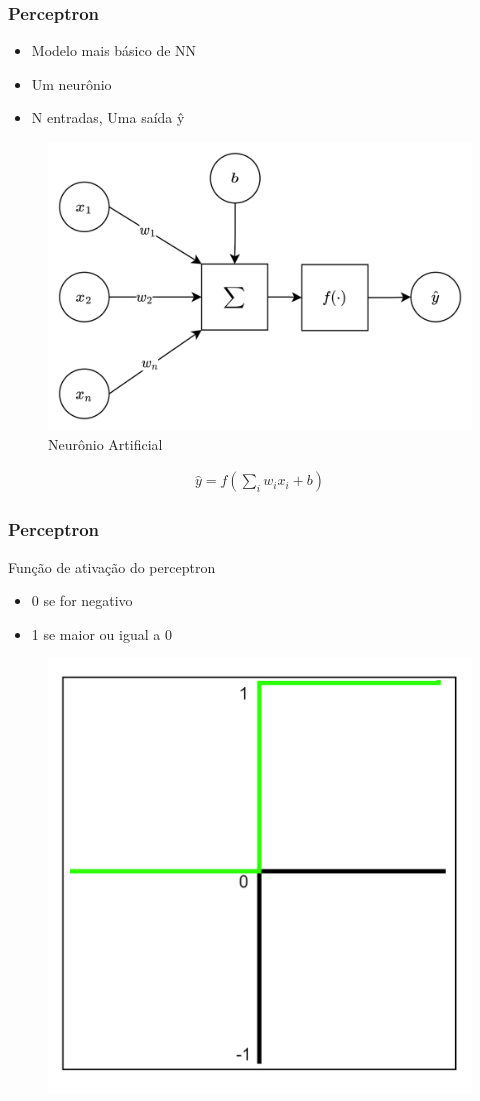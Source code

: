 \documentclass{beamer}
\begin{document}
\begin{frame}
	\frametitle{Perceptron}
	\begin{itemize}
		\item Modelo mais básico de NN
		\item Um neurônio
		\item N entradas, Uma saída ŷ
	\end{itemize}
	\begin{figure}
		\centering
		\includegraphics[width=0.4\linewidth]{figures/neuron_ai}
		\caption{Neurônio Artificial}
	\end{figure}

	\begin{gather*}
		\hat{y} = f( \sum_i w_i x_i + b)
	\end{gather*}
\end{frame}
\begin{frame}
	\frametitle{Perceptron}
	\begin{block}{Função de ativação do perceptron}
		\begin{itemize}
			\item 0 se for negativo
			\item 1 se maior ou igual a 0
		\end{itemize}
	\end{block}
	
	\begin{figure}
		\centering
		\includegraphics[width=0.4\linewidth]{figures/step_function}
	\end{figure}
\end{frame}
\end{document}
